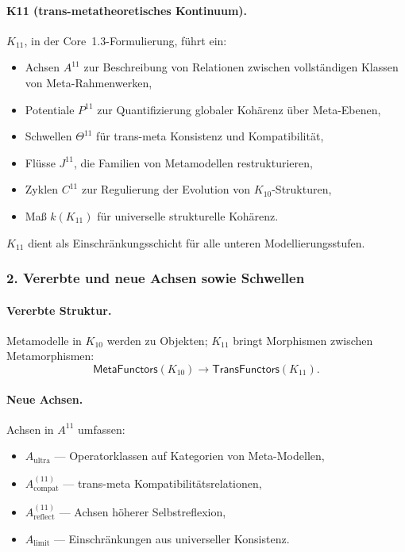 \paragraph{K11 (trans-metatheoretisches Kontinuum).}
$K_{11}$, in der Core~1.3-Formulierung, führt ein:
\begin{itemize}
  \item Achsen $A^{11}$ zur Beschreibung von Relationen zwischen vollständigen
        Klassen von Meta-Rahmenwerken,
  \item Potentiale $P^{11}$ zur Quantifizierung globaler Kohärenz über Meta-Ebenen,
  \item Schwellen $\Theta^{11}$ für trans-meta Konsistenz und Kompatibilität,
  \item Flüsse $J^{11}$, die Familien von Metamodellen restrukturieren,
  \item Zyklen $C^{11}$ zur Regulierung der Evolution von $K_{10}$-Strukturen,
  \item Maß $k(K_{11})$ für universelle strukturelle Kohärenz.
\end{itemize}

$K_{11}$ dient als Einschränkungsschicht für alle unteren Modellierungsstufen.

\subsubsection{2. Vererbte und neue Achsen sowie Schwellen}

\paragraph{Vererbte Struktur.}
Metamodelle in $K_{10}$ werden zu Objekten; $K_{11}$ bringt Morphismen zwischen
Metamorphismen:
\[
\mathsf{MetaFunctors}(K_{10}) \rightarrow \mathsf{TransFunctors}(K_{11}).
\]

\paragraph{Neue Achsen.}
Achsen in $A^{11}$ umfassen:
\begin{itemize}
  \item $A_{\mathrm{ultra}}$ — Operatorklassen auf Kategorien von Meta-Modellen,
  \item $A_{\mathrm{compat}}^{(11)}$ — trans-meta Kompatibilitätsrelationen,
  \item $A_{\mathrm{reflect}}^{(11)}$ — Achsen höherer Selbstreflexion,
  \item $A_{\mathrm{limit}}$ — Einschränkungen aus universeller Konsistenz.
\end{itemize}

